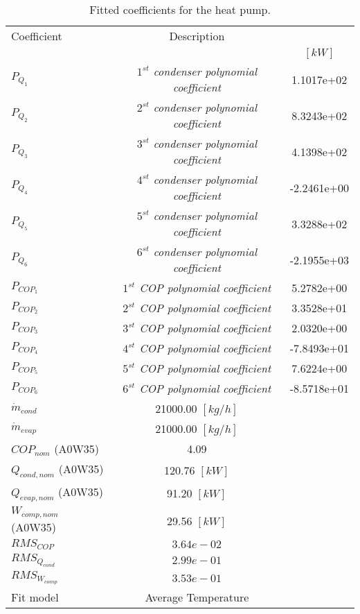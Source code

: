 \documentclass[english]{SPFShortReport}
\author{Dani Carbonell}
\begin{document}
\begin{table}[!ht]
\begin{small}
\caption{Fitted coefficients for the heat pump.}
\begin{center}
\resizebox{12cm}{!} 
{
\begin{tabular}{l | c c } 
\hline
\hline
Coefficient &Description & \\ 
 & &$[kW]$\\ 
\hline
$P_{Q_{1}}$ & \emph{$1^{st}$ condenser polynomial coefficient}  & 1.1017e+02    \\ 
$P_{Q_{2}}$ & \emph{$2^{st}$ condenser polynomial coefficient}  & 8.3243e+02    \\ 
$P_{Q_{3}}$ & \emph{$3^{st}$ condenser polynomial coefficient}  & 4.1398e+02    \\ 
$P_{Q_{4}}$ & \emph{$4^{st}$ condenser polynomial coefficient}  & -2.2461e+00    \\ 
$P_{Q_{5}}$ & \emph{$5^{st}$ condenser polynomial coefficient}  & 3.3288e+02    \\ 
$P_{Q_{6}}$ & \emph{$6^{st}$ condenser polynomial coefficient}  & -2.1955e+03    \\ 
\hline
$P_{COP_{1}}$ & \emph{$1^{st}$ COP polynomial coefficient}  & 5.2782e+00    \\ 
$P_{COP_{2}}$ & \emph{$2^{st}$ COP polynomial coefficient}  & 3.3528e+01    \\ 
$P_{COP_{3}}$ & \emph{$3^{st}$ COP polynomial coefficient}  & 2.0320e+00    \\ 
$P_{COP_{4}}$ & \emph{$4^{st}$ COP polynomial coefficient}  & -7.8493e+01    \\ 
$P_{COP_{5}}$ & \emph{$5^{st}$ COP polynomial coefficient}  & 7.6224e+00    \\ 
$P_{COP_{6}}$ & \emph{$6^{st}$ COP polynomial coefficient}  & -8.5718e+01    \\ 
\hline
$\dot m_{cond}$ & 21000.00 $[kg/h]$ \\ 
$\dot m_{evap}$ & 21000.00 $[kg/h]$ \\ 
\hline
$COP_{nom}$ (A0W35)& 4.09 \\ 
$Q_{cond,nom}$ (A0W35)& 120.76 $[kW]$\\ 
$Q_{evap,nom}$ (A0W35)& 91.20 $[kW]$\\ 
$W_{comp,nom}$ (A0W35)& 29.56 $[kW]$\\ 
\hline
 $RMS_{COP}$ & $3.64e-02$ \\ 
 $RMS_{Q_{cond}}$ & $2.99e-01$ \\ 
 $RMS_{W_{comp}}$ & $3.53e-01$ \\ 
\hline
Fit model & Average Temperature\\ 
\hline
\hline
\end{tabular}
}
\label{CoefTable}
\end{center}
\end{small}
\end{table}
\end{document}
